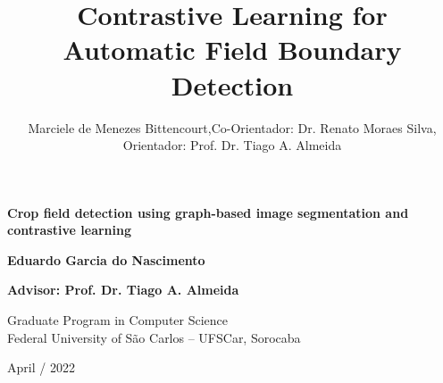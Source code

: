 \documentclass[xcolor=table]{beamer}
\title[Exame de Qualificação]{Contrastive Learning for Automatic Field Boundary Detection}
\author[PPGCCS -- UFSCar]{Marciele de Menezes Bittencourt,Co-Orientador: Dr. Renato Moraes Silva, Orientador: Prof. Dr. Tiago A. Almeida}
\date{\footnotesize}
\begin{document}
\begin{frame}
	\begin{center}

	\vspace{0.3in}

	\LARGE \textbf{Crop field detection using graph-based image segmentation and contrastive learning}

	\vspace{0.2in}

	{\Large \textbf{Eduardo Garcia do Nascimento}}

	\vspace{0.2in}
	{\normalsize \textbf{Advisor: Prof. Dr. Tiago A. Almeida}}

	\vspace{0.2in}
	{\small{ Graduate Program in Computer Science\\  [-0.1in]Federal University of São Carlos -- UFSCar, Sorocaba}}

	{\normalsize April / 2022}

	\vfill
	\vfill

	\end{center}
\end{frame}

%	
%	
\end{document}
